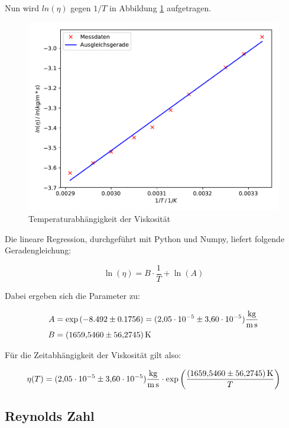 Nun wird $ln(\eta)$ gegen $1/T$ in Abbildung \ref{fig:plot} aufgetragen.

\begin{figure}
  \centering
  \includegraphics[scale=0.7]{content/plot1.pdf}
  \caption{Temperaturabhängigkeit der Viskosität}
  \label{fig:plot}
\end{figure}

Die lineare Regression, durchgeführt mit Python und Numpy, 
liefert folgende Geradengleichung: 

\begin{equation*}
\ln{(\eta)} = B\cdot \frac{1}{T} + \ln{(A)}
\end{equation*}

Dabei ergeben sich die Parameter zu: 

\begin{align*}
A &= \exp{(-8.492\pm0.1756)} = (\num{2.05e-5}\pm\num{3.60e-5})\si{\kilo\gram\per\meter\per\second} \\
B &= \SI{1659.546+-56.2745}{\kelvin}
\end{align*}

Für die Zeitabhängigkeit der Viskosität gilt also:

\begin{equation*}
\eta (T) = (\num{2.05e-5}\pm\num{3.60e-5})\si{\kilo\gram\per\meter\per\second} \cdot \exp{\left(\frac{\SI{1659.546+-56.2745}{\kelvin}}{T}\right)}
\end{equation*}

\subsection{Reynolds Zahl}

